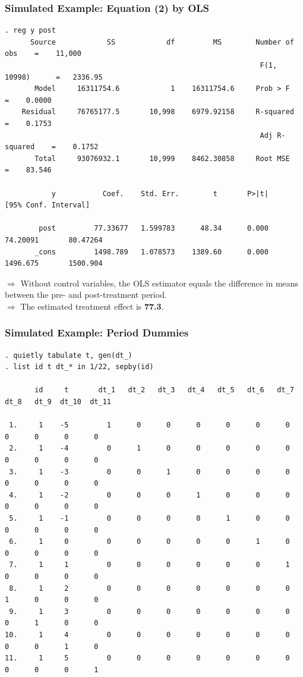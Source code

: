 \documentclass[11pt,aspectratio=169]{beamer}
\begin{document}
\begin{frame}[fragile]
  \frametitle{Simulated Example: Equation (2) by OLS}
{\scriptsize
\begin{verbatim}
. reg y post
      Source            SS            df         MS        Number of obs    =    11,000
                                                            F(1, 10998)      =   2336.95
       Model     16311754.6            1    16311754.6     Prob > F         =    0.0000
    Residual     76765177.5       10,998    6979.92158     R-squared        =    0.1753
                                                            Adj R-squared    =    0.1752
       Total     93076932.1       10,999    8462.30858     Root MSE         =    83.546

           y           Coef.    Std. Err.        t       P>|t|     [95% Conf. Interval]

        post         77.33677   1.599783      48.34      0.000     74.20091       80.47264
       _cons         1498.789   1.078573    1389.60      0.000     1496.675       1500.904
\end{verbatim}
}
\vspace{0.3em}
$\Rightarrow$ Without control variables, the OLS estimator equals the difference in means between the pre- and post-treatment period.\\
$\Rightarrow$ The estimated treatment effect is \textbf{77.3}.
\end{frame}

\begin{frame}[fragile]
  \frametitle{Simulated Example: Period Dummies}
{\scriptsize
\begin{verbatim}
. quietly tabulate t, gen(dt_)
. list id t dt_* in 1/22, sepby(id)

       id     t       dt_1   dt_2   dt_3   dt_4   dt_5   dt_6   dt_7   dt_8   dt_9  dt_10  dt_11

 1.     1    -5         1      0      0      0      0      0      0      0      0      0      0
 2.     1    -4         0      1      0      0      0      0      0      0      0      0      0
 3.     1    -3         0      0      1      0      0      0      0      0      0      0      0
 4.     1    -2         0      0      0      1      0      0      0      0      0      0      0
 5.     1    -1         0      0      0      0      1      0      0      0      0      0      0
 6.     1     0         0      0      0      0      0      1      0      0      0      0      0
 7.     1     1         0      0      0      0      0      0      1      0      0      0      0
 8.     1     2         0      0      0      0      0      0      0      1      0      0      0
 9.     1     3         0      0      0      0      0      0      0      0      1      0      0
10.     1     4         0      0      0      0      0      0      0      0      0      1      0
11.     1     5         0      0      0      0      0      0      0      0      0      0      1
\end{verbatim}
}
\end{frame}
\end{document}
